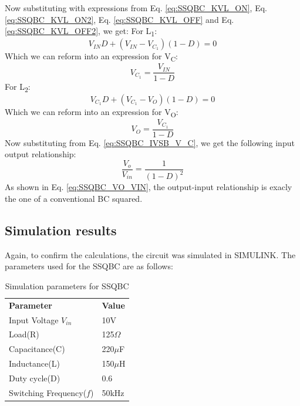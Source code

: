 Now substituting with expressions from Eq. \ref{eq:SSQBC_KVL_ON}, Eq. \ref{eq:SSQBC_KVL_ON2}, Eq. \ref{eq:SSQBC_KVL_OFF} and  Eq. \ref{eq:SSQBC_KVL_OFF2}, we get:
For L\textsubscript{1}:
\begin{equation}
	V_{IN}D+(V_{IN}-V_{C_1})(1-D)=0
	\label{eq:SSQBC_IVSB_L1}
\end{equation}
Which we can reform into an expression for V\textsubscript{C}:
\begin{equation}
	V_{C_1}=\frac{V_{IN}}{1-D}
	\label{eq:SSQBC_IVSB_V_C}
\end{equation}
For L\textsubscript{2}:
\begin{equation}
	V_{C_1}D+(V_{C_1}-V_{O})(1-D)=0
	\label{eq:SSQBC_IVSB_L2}
\end{equation}
Which we can reform into an expression for V\textsubscript{O}:
\begin{equation}
	V_{O}=\frac{V_{C_1}}{1-D}
	\label{eq:SSQBC_IVSB_V_O}
\end{equation}
Now substituting from Eq. \ref{eq:SSQBC_IVSB_V_C}, we get the following input output relationship:
\begin{equation}
	\frac{V_o}{V_{in}} = \frac{1}{(1-D)^2}
	\label{eq:SSQBC_VO_VIN}
\end{equation}
As shown in Eq. \ref{eq:SSQBC_VO_VIN}, the output-input relationship is exacly the one of a conventional BC squared. 

\subsection{Simulation results}

Again, to confirm the calculations, the circuit was simulated in SIMULINK. The parameters used for the SSQBC are as follows:

\begin{table}[H]
\begin{center}
\caption {Simulation parameters for SSQBC} \label{tab:SSQBC} 
\begin{tabular}{|l|l|}
\cline{1-2}
\textbf{Parameter} & \textbf{Value}  \\ \cline{1-2}
Input Voltage $V_{in}$          &      10V   \\ \cline{1-2}
Load(R)   & 125$\Omega$           \\ \cline{1-2}
Capacitance(C)          &       220$\mu$F     \\ \cline{1-2}
Inductance(L)          &      150$\mu$H      \\ \cline{1-2}
Duty cycle(D)          &     0.6       \\ \cline{1-2}
Switching Frequency($f$)          &      50kHz      \\ \cline{1-2}
\end{tabular}
\end{center}
\end{table}


